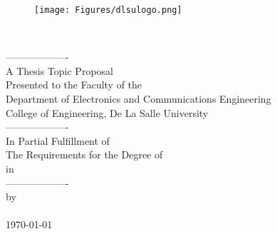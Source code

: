 \documentclass[12pt,oneside,letterpaper]{Thesis} %
\begin{document}
\begin{titlepage}
\begin{center}

\bigskip
\begin{figure}
	\centering
	\texttt{[image: Figures/dlsulogo.png]}
	\label{fig:dlsulogo}
\end{figure}
{\ttitle}\\[0.4cm] %


\begin{center}
	
	-------------------\\
	\bigskip
	A Thesis Topic Proposal\\
	Presented to the Faculty of the\\
	Department of Electronics and Communications Engineering\\
	College of Engineering, De La Salle University\\
	\bigskip
	-------------------\\
	\bigskip
	In Partial Fulfillment of\\
	The Requirements for the Degree of\\
	\degreename	\space in \deptname\\
	\bigskip
	-------------------\\
	\bigskip
	by\\
	\bigskip
	\authornames \\
	\bigskip
	\today
	
\end{center}




\end{center}
\end{titlepage}
\end{document}
